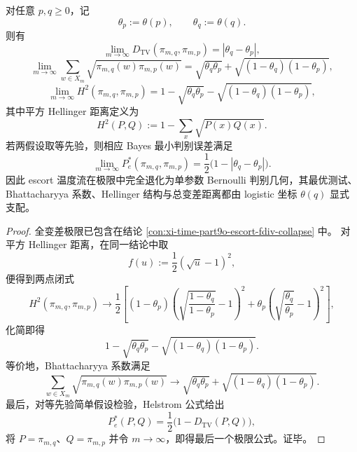 \begin{corollary}\label{cor:xi-time-part9o-escort-testing-geometry-closed}
对任意 \(p,q\ge 0\)，记
\[
\theta_p:=\theta(p),
\qquad
\theta_q:=\theta(q).
\]
则有
\[
\lim_{m\to\infty}D_{\mathrm{TV}}(\pi_{m,q},\pi_{m,p})
=
|\theta_q-\theta_p|,
\]
\[
\lim_{m\to\infty}\sum_{w\in X_m}\sqrt{\pi_{m,q}(w)\pi_{m,p}(w)}
=
\sqrt{\theta_q\theta_p}+\sqrt{(1-\theta_q)(1-\theta_p)},
\]
\[
\lim_{m\to\infty}H^2(\pi_{m,q},\pi_{m,p})
=
1-\sqrt{\theta_q\theta_p}-\sqrt{(1-\theta_q)(1-\theta_p)},
\]
其中平方 Hellinger 距离定义为
\[
H^2(P,Q):=1-\sum_x\sqrt{P(x)Q(x)}.
\]
若两假设取等先验，则相应 Bayes 最小判别误差满足
\[
\lim_{m\to\infty}P_e^\ast(\pi_{m,q},\pi_{m,p})
=
\frac12\bigl(1-|\theta_q-\theta_p|\bigr).
\]
因此 escort 温度流在极限中完全退化为单参数 Bernoulli 判别几何，其最优测试、Bhattacharyya 系数、Hellinger 结构与总变差距离都由 logistic 坐标 \(\theta(q)\) 显式支配。
\end{corollary}
\begin{proof}
全变差极限已包含在结论 \ref{con:xi-time-part9o-escort-fdiv-collapse} 中。
对平方 Hellinger 距离，在同一结论中取
\[
f(u):=\frac12(\sqrt u-1)^2,
\]
便得到两点闭式
\[
H^2(\pi_{m,q},\pi_{m,p})
\longrightarrow
\frac12\left[
(1-\theta_p)\left(\sqrt{\frac{1-\theta_q}{1-\theta_p}}-1\right)^2
+
\theta_p\left(\sqrt{\frac{\theta_q}{\theta_p}}-1\right)^2
\right],
\]
化简即得
\[
1-\sqrt{\theta_q\theta_p}-\sqrt{(1-\theta_q)(1-\theta_p)}.
\]
等价地，Bhattacharyya 系数满足
\[
\sum_{w\in X_m}\sqrt{\pi_{m,q}(w)\pi_{m,p}(w)}
\longrightarrow
\sqrt{\theta_q\theta_p}+\sqrt{(1-\theta_q)(1-\theta_p)}.
\]
最后，对等先验简单假设检验，Helstrom 公式给出
\[
P_e^\ast(P,Q)=\frac12\bigl(1-D_{\mathrm{TV}}(P,Q)\bigr),
\]
将 \(P=\pi_{m,q}\)、\(Q=\pi_{m,p}\) 并令 \(m\to\infty\)，即得最后一个极限公式。证毕。
\end{proof}

